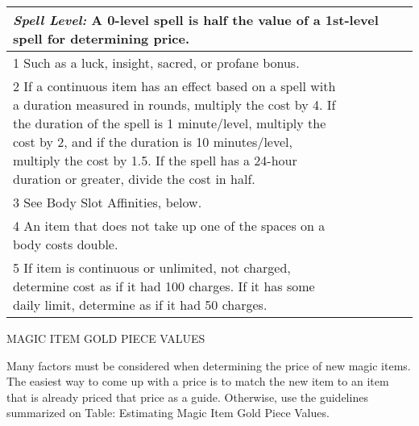 \begin{longtable}{llllll}
\hline
\multicolumn{4}{p{1.366in}|}{\begin{minipage}[t]{1.366in}\raggedright
\textit{Spell Level: }A 0-level spell is half the value of a 1st-level spell for 
determining price.\end{minipage}}\\
\hline
\multicolumn{1}{|p{1.506in}|}{\begin{minipage}[t]{1.506in}\raggedright
1 Such as a luck, insight, sacred, or profane bonus.\end{minipage}}\\
\hline
\multicolumn{1}{p{1.628in}|}{\begin{minipage}[t]{1.628in}\raggedright
2 If a continuous item has an effect based on a spell with a duration measured 
in rounds, multiply the cost by 4. If the duration of the spell is 1 minute/level, 
multiply the cost by 2, and if the duration is 10 minutes/level, multiply the cost 
by 1.5. If the spell has a 24-hour duration or greater, divide the cost in half.\end{minipage}}\\
\hline
\multicolumn{4}{p{1.366in}|}{\begin{minipage}[t]{1.366in}\raggedright
3 See Body Slot Affinities, below.\end{minipage}}\\
\hline
\multicolumn{1}{|p{1.506in}|}{\begin{minipage}[t]{1.506in}\raggedright
4 An item that does not take up one of the spaces on a body costs double.\end{minipage}}\\
\hline
\multicolumn{1}{p{1.628in}|}{\begin{minipage}[t]{1.628in}\raggedright
5 If item is continuous or unlimited, not charged, determine cost as if it had 
100 charges. If it has some daily limit, determine as if it had 50 charges.\end{minipage}}\\
\hline
\end{longtable}

\vspace{12pt}
MAGIC ITEM GOLD PIECE VALUES

Many factors must be considered when determining the price of new magic items. 
The easiest way to come up with a price is to match the new item to an item that 
is already priced that price as a guide. Otherwise, use the guidelines summarized 
on Table: Estimating Magic Item Gold Piece Values.

